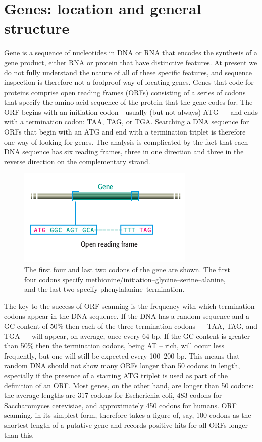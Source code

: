 \section{Genes: location and general structure}
Gene is a sequence of nucleotides in DNA or RNA that encodes the synthesis of a gene product, either RNA or protein that have distinctive features. At present we 
do not fully understand the nature of all of these specific features, and sequence inspection is therefore not a foolproof way of locating genes. 
Genes that code for proteins comprise open reading frames (ORFs) consisting of a series of codons that specify the amino acid sequence of the protein
that the gene codes for. The ORF begins with an initiation codon—usually (but not always) ATG — and ends with a termination codon: TAA, TAG, or TGA. 
Searching a DNA sequence for ORFs that begin with an ATG and end with a termination triplet is therefore one way of looking for genes. The analysis is 
complicated by the fact that each DNA sequence has six reading frames, three in one direction and three in the reverse direction on the complementary strand.

\begin{figure}[!ht]
	\centering
	\includegraphics[width=.9\textwidth]{figures/ORF1.png}
	\caption{The
	first four and last two codons of the gene
	are shown. The first four codons specify
	methionine/initiation–glycine–serine–alanine,
	and the last two specify
	phenylalanine–termination.\label{o:latex_friendly_zone}}
\end{figure}

The key to the success of ORF scanning is the frequency with which termination codons appear in the DNA sequence. If the DNA has a random sequence
and a GC content of 50\% then each of the three termination codons — TAA, TAG, and TGA — will appear, on average, once every 64 bp. If the GC content 
is greater than 50\% then the termination codons, being AT – rich, will occur less frequently, but one will still be expected every 100–200 bp. This
means that random DNA should not show many ORFs longer than 50 codons in length, especially if the presence of a starting ATG triplet is used as part of
the definition of an ORF. Most genes, on the other hand, are longer than 50 codons: the average lengths are 317 codons for Escherichia coli, 483 codons
for Saccharomyces cerevisiae, and approximately 450 codons for humans. ORF scanning, in its simplest form, therefore takes a figure of, say, 100 codons
as the shortest length of a putative gene and records positive hits for all ORFs longer than this.



